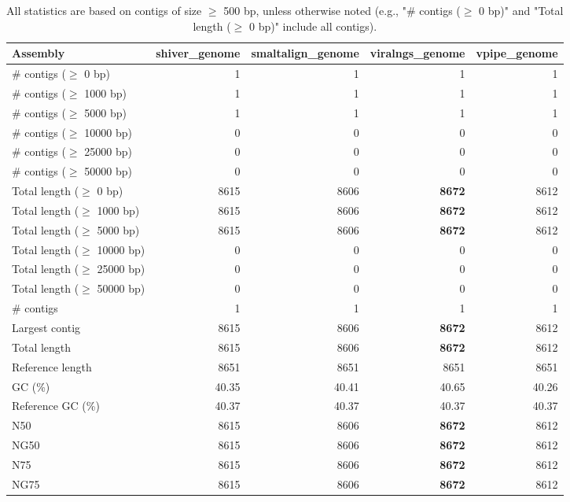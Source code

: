 \documentclass[12pt,a4paper]{article}
\begin{document}
\begin{table}[ht]
\begin{center}
\caption{All statistics are based on contigs of size $\geq$ 500 bp, unless otherwise noted (e.g., "\# contigs ($\geq$ 0 bp)" and "Total length ($\geq$ 0 bp)" include all contigs).}
\begin{tabular}{|l*{4}{|r}|}
\hline
Assembly & shiver\_genome & smaltalign\_genome & viralngs\_genome & vpipe\_genome \\ \hline
\# contigs ($\geq$ 0 bp) & 1 & 1 & 1 & 1 \\ \hline
\# contigs ($\geq$ 1000 bp) & 1 & 1 & 1 & 1 \\ \hline
\# contigs ($\geq$ 5000 bp) & 1 & 1 & 1 & 1 \\ \hline
\# contigs ($\geq$ 10000 bp) & 0 & 0 & 0 & 0 \\ \hline
\# contigs ($\geq$ 25000 bp) & 0 & 0 & 0 & 0 \\ \hline
\# contigs ($\geq$ 50000 bp) & 0 & 0 & 0 & 0 \\ \hline
Total length ($\geq$ 0 bp) & 8615 & 8606 & {\bf 8672} & 8612 \\ \hline
Total length ($\geq$ 1000 bp) & 8615 & 8606 & {\bf 8672} & 8612 \\ \hline
Total length ($\geq$ 5000 bp) & 8615 & 8606 & {\bf 8672} & 8612 \\ \hline
Total length ($\geq$ 10000 bp) & 0 & 0 & 0 & 0 \\ \hline
Total length ($\geq$ 25000 bp) & 0 & 0 & 0 & 0 \\ \hline
Total length ($\geq$ 50000 bp) & 0 & 0 & 0 & 0 \\ \hline
\# contigs & 1 & 1 & 1 & 1 \\ \hline
Largest contig & 8615 & 8606 & {\bf 8672} & 8612 \\ \hline
Total length & 8615 & 8606 & {\bf 8672} & 8612 \\ \hline
Reference length & 8651 & 8651 & 8651 & 8651 \\ \hline
GC (\%) & 40.35 & 40.41 & 40.65 & 40.26 \\ \hline
Reference GC (\%) & 40.37 & 40.37 & 40.37 & 40.37 \\ \hline
N50 & 8615 & 8606 & {\bf 8672} & 8612 \\ \hline
NG50 & 8615 & 8606 & {\bf 8672} & 8612 \\ \hline
N75 & 8615 & 8606 & {\bf 8672} & 8612 \\ \hline
NG75 & 8615 & 8606 & {\bf 8672} & 8612 \\ \hline

\end{tabular}
\end{center}
\end{table}
\end{document}
